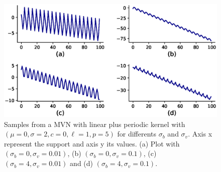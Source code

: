 \documentclass{article}
\begin{document}
\begin{figure}[h]
\includegraphics[scale=0.45]{img/linear_periodic.eps}  
\caption{Samples from a MVN with linear plus periodic kernel with $(\mu=0, \sigma=2, c=0, \ell=1, p=5)$ for differents $\sigma_{b}$ and $\sigma_{v}$. Axis x represent the support and axis y its values. (a) Plot with $(\sigma_{b}=0, \sigma_{v}=0.01)$, (b) $(\sigma_{b}=0, \sigma_{v}=0.1)$, (c) $(\sigma_{b}=4, \sigma_{v}=0.01)$ and (d) $(\sigma_{b}=4, \sigma_{v}=0.1)$.}
\end{figure}
\end{document}
